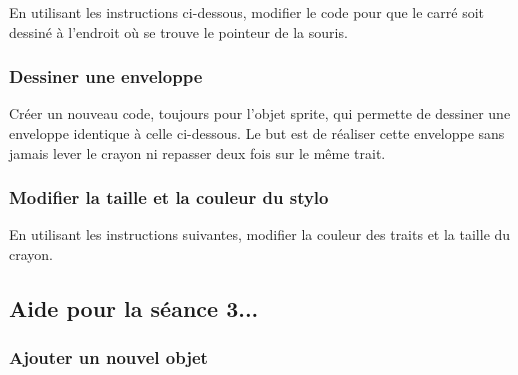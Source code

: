 En utilisant les instructions ci-dessous, modifier le code pour que le carré soit dessiné à l'endroit où se trouve le pointeur de la souris.



\subsubsection{Dessiner une enveloppe}

Créer un nouveau code, toujours pour l'objet sprite, qui permette de dessiner une enveloppe identique à celle ci-dessous. Le but est de réaliser cette enveloppe sans jamais lever le crayon ni repasser deux fois sur le même trait.





\subsubsection{Modifier la taille et la couleur du stylo}

En utilisant les instructions suivantes, modifier la couleur des traits et la taille du crayon.











%
%
%
%









\subsection{Aide pour la séance 3...}\label{correction_scratch3}



\subsubsection{Ajouter un nouvel objet}

